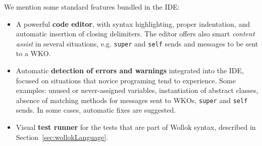 We mention some standard features bundled in the IDE:
\begin{itemize}
\item 
A powerful \textbf{code editor}, with syntax highlighting, proper indentation, and automatic insertion of closing delimiters. The editor offers also smart \emph{content assist} in several situations, e.g. \texttt{super} and \texttt{self} sends and messages to be sent to a WKO.

\item
Automatic \textbf{detection of errors and warnings} integrated into the IDE, focused on situations that novice programing tend to experience. Some examples: unused or never-assigned variables, instantiation of abstract classes, absence of matching methods for messages sent to WKOs, \texttt{super} and \texttt{self} sends. In some cases, automatic fixes are suggested.

\item
Visual \textbf{test runner} for the tests that are part of Wollok syntax, described in Section~\ref{sec:wollokLanguage}.
\end{itemize}
